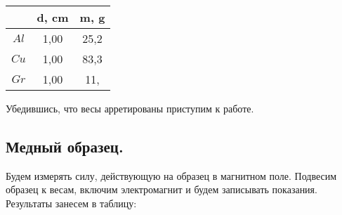 \documentclass{article}
\begin{document}
    \begin {table}[H]
        \centering
    \begin{tabular}{|c|c|c|}
        \hline
                & d, cm & m, g  \\\hline
        \(Al\)  & 1,00  & 25,2  \\\hline
        \(Cu\)  & 1,00  & 83,3  \\\hline
        \(Gr\)  & 1,00  & 11,   \\\hline
        
        
    \end{tabular}
    \end{table}


    Убедившись, что весы арретированы приступим к работе.

    \subsection{Медный образец.}
    Будем измерять силу, действующую на образец в магнитном поле. Подвесим образец к весам,
    включим электромагнит и будем записывать показания. Результаты занесем в таблицу:
\end{document}
